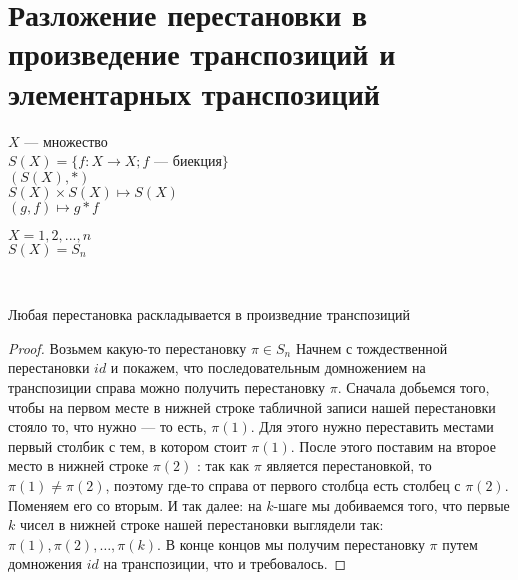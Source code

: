 \section{Разложение перестановки в произведение транспозиций и элементарных транспозиций}

\begin{conj} 
    $X$ --- множество\\
    $S(X) = \{f: X \longrightarrow X; f$ --- биекция$\}$\\
    
    $(S(X), *)$\\
    $S(X) \times S(X) \mapsto S(X)$\\
    $(g, f) \mapsto g*f$\\
\end{conj}

\begin{conj} 
    $X = {1, 2, ..., n}$\\
    $S(X) = S_n$
\end{conj}
\
\begin{theorem-non}
    Любая перестановка раскладывается в произведние транспозиций

    \begin{proof}
        Возьмем какую-то перестановку $\pi \in S_n$
        Начнем с тождественной перестановки $id$ и покажем, 
        что последовательным домножением на транспозиции справа можно получить 
        перестановку $\pi$. Сначала добьемся того, чтобы на первом месте в нижней строке 
        табличной записи нашей перестановки стояло то, что нужно — то есть, $\pi(1)$. 
        Для этого нужно переставить местами первый столбик с тем, в котором стоит $\pi(1)$.
        После этого поставим на второе место в нижней строке $\pi(2)$ : так как $\pi$ является 
        перестановкой, то $\pi(1) \neq \pi(2)$, поэтому где-то справа от первого столбца есть 
        столбец с $\pi(2)$. Поменяем его со вторым. И так далее: на $k$-шаге мы добиваемся того, 
        что первые $k$ чисел в нижней строке нашей перестановки выглядели так: $\pi(1), \pi(2), \dots, \pi(k)$.
        В конце концов мы получим перестановку $\pi$ путем домножения $id$ на транспозиции, что и требовалось.
    \end{proof}
\end{theorem-non}

